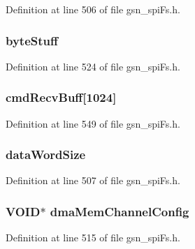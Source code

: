 Definition at line 506 of file gsn\_\-spiFs.h.

\hypertarget{a00232_a7607005ffbebdca79ab3c4d558d0e442}{
\subsubsection[{byteStuff}]{ {\bf byteStuff}}}
\label{a00232_a7607005ffbebdca79ab3c4d558d0e442}


Definition at line 524 of file gsn\_\-spiFs.h.

\hypertarget{a00232_a3243c706791a4fef4156fb465c41dc42}{
\subsubsection[{cmdRecvBuff}]{ {\bf cmdRecvBuff}\mbox{[}1024\mbox{]}}}
\label{a00232_a3243c706791a4fef4156fb465c41dc42}


Definition at line 549 of file gsn\_\-spiFs.h.

\hypertarget{a00232_ad3c2f2d6e4146b01aa1dd5ba2745ce46}{
\subsubsection[{dataWordSize}]{ {\bf dataWordSize}}}
\label{a00232_ad3c2f2d6e4146b01aa1dd5ba2745ce46}


Definition at line 507 of file gsn\_\-spiFs.h.

\hypertarget{a00232_a4ceeab023e36f53fe50f6ab4a197961d}{
\subsubsection[{dmaMemChannelConfig}]{\setlength{\rightskip}{0pt plus 5cm}VOID$\ast$ {\bf dmaMemChannelConfig}}}
\label{a00232_a4ceeab023e36f53fe50f6ab4a197961d}


Definition at line 515 of file gsn\_\-spiFs.h.

